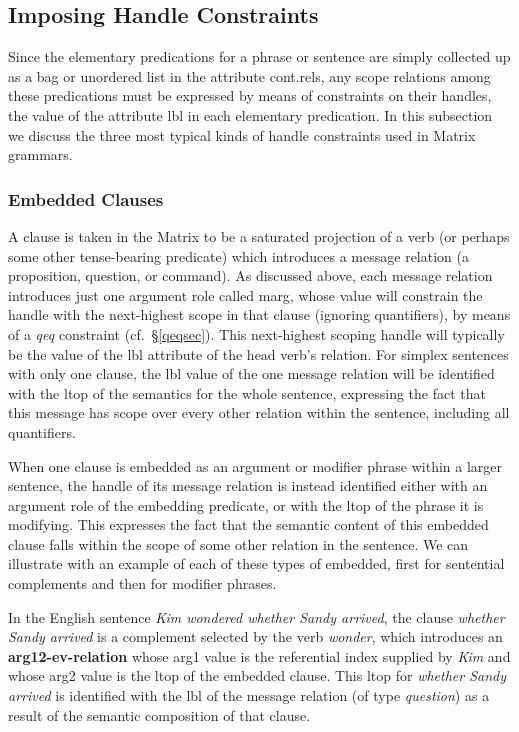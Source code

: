 \documentclass[12pt]{article}
\newcommand{\mpt}[1]{\marginpar{\tiny #1}}
\begin{document}
\subsection{Imposing Handle Constraints}
\label{hconssec}

Since the elementary predications for a phrase or sentence are simply
collected up as a bag or unordered list in the attribute {\sc cont.rels},
any scope relations among these predications must be expressed by means of
constraints on their handles, the value of the attribute {\sc lbl} in each
elementary predication.  In this subsection we discuss the three most typical
kinds of handle constraints used in Matrix grammars.

\subsubsection{Embedded Clauses}
\label{msgsec}

A clause is taken in the Matrix to be a saturated projection of a verb (or\mpt{Update this section}
perhaps some other tense-bearing predicate) which introduces a message
relation (a proposition, question, or command).  As discussed above, each
message relation introduces just one argument role called {\sc marg}, whose
value will constrain the handle with the next-highest scope in that clause
(ignoring quantifiers), by means of a {\it qeq} constraint
(cf.\ \S\ref{qeqsec}).
This next-highest scoping handle will typically be the value of the {\sc lbl}
attribute of the head verb's relation.  For simplex sentences with only one
clause, the {\sc lbl} value of the one message relation will be identified
with the {\sc ltop} of the semantics for the whole sentence, expressing the
fact that this message has scope over every other relation within the
sentence, including all quantifiers.

When one clause is embedded as an argument or modifier phrase within a larger
sentence, the handle of its message relation is instead identified either with
an argument role of the embedding predicate, or with the {\sc ltop} of the
phrase it is modifying.  This expresses the fact that the semantic content
of this embedded clause falls within the scope of some other relation in the
sentence.  We can illustrate with an example of each of these types of
embedded, first for sentential complements and then for modifier phrases.

In the English sentence {\it Kim wondered whether Sandy arrived}, the clause
{\it whether Sandy arrived} is a complement selected by the verb {\it wonder},
which introduces an {\bf arg12-ev-relation} whose {\sc arg1} value is the
referential index supplied by {\it Kim} and whose {\sc arg2} value is the
{\sc ltop} of the embedded clause.  This {\sc ltop} for {\it whether Sandy
arrived} is identified with the {\sc lbl} of the message relation (of type
{\it question}) as a result of the semantic composition of that clause.
\end{document}
